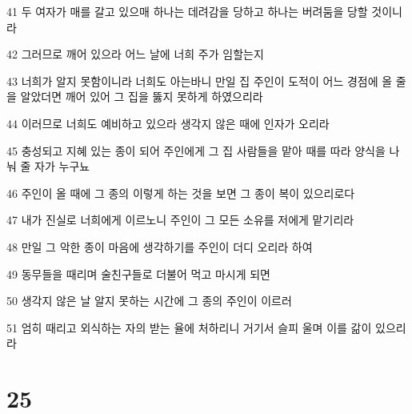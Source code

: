 \par 41 두 여자가 매를 갈고 있으매 하나는 데려감을 당하고 하나는 버려둠을 당할 것이니라
\par 42 그러므로 깨어 있으라 어느 날에 너희 주가 임할는지
\par 43 너희가 알지 못함이니라 너희도 아는바니 만일 집 주인이 도적이 어느 경점에 올 줄을 알았더면 깨어 있어 그 집을 뚫지 못하게 하였으리라
\par 44 이러므로 너희도 예비하고 있으라 생각지 않은 때에 인자가 오리라
\par 45 충성되고 지혜 있는 종이 되어 주인에게 그 집 사람들을 맡아 때를 따라 양식을 나눠 줄 자가 누구뇨
\par 46 주인이 올 때에 그 종의 이렇게 하는 것을 보면 그 종이 복이 있으리로다
\par 47 내가 진실로 너희에게 이르노니 주인이 그 모든 소유를 저에게 맡기리라
\par 48 만일 그 악한 종이 마음에 생각하기를 주인이 더디 오리라 하여
\par 49 동무들을 때리며 술친구들로 더불어 먹고 마시게 되면
\par 50 생각지 않은 날 알지 못하는 시간에 그 종의 주인이 이르러
\par 51 엄히 때리고 외식하는 자의 받는 율에 처하리니 거기서 슬피 울며 이를 갊이 있으리라

\chapter{25}

